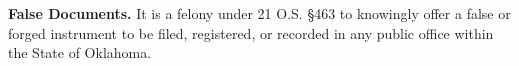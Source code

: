 \textbf{False Documents.}
It is a felony under 21 O.S. \S463 to knowingly offer a false or forged
instrument to be filed, registered, or recorded in any public office within the
State of Oklahoma.